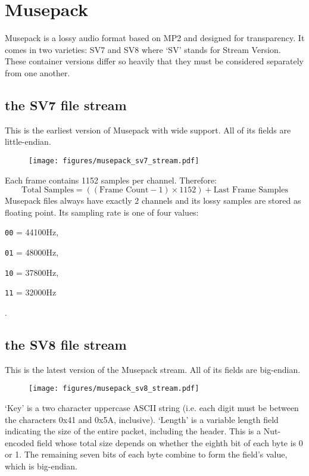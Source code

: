\chapter{Musepack}
Musepack is a lossy audio format based on MP2 and designed for
transparency.
It comes in two varieties: SV7 and SV8 where `SV' stands for
Stream Version.
These container versions differ so heavily that they must be
considered separately from one another.
\section{the SV7 file stream}
This is the earliest version of Musepack with wide support.
All of its fields are little-endian.
\begin{figure}[h]
\texttt{[image: figures/musepack\_sv7\_stream.pdf]}
\end{figure}
Each frame contains 1152 samples per channel.
Therefore:
\begin{equation}
\text{Total Samples} = ((\text{Frame Count} - 1) \times 1152) + \text{Last Frame Samples}
\end{equation}
Musepack files always have exactly 2 channels and its lossy samples
are stored as floating point.
Its sampling rate is one of four values:

\begin{inparaenum}
\item[\texttt{00} = ] 44100Hz,
\item[\texttt{01} = ] 48000Hz,
\item[\texttt{10} = ] 37800Hz,
\item[\texttt{11} = ] 32000Hz
\end{inparaenum}
.

\pagebreak

\section{the SV8 file stream}
This is the latest version of the Musepack stream.
All of its fields are big-endian.
\begin{figure}[h]
\texttt{[image: figures/musepack\_sv8\_stream.pdf]}
\end{figure}
\par
\noindent
`Key' is a two character uppercase ASCII string
(i.e. each digit must be between the characters 0x41 and 0x5A, inclusive).
`Length' is a variable length field indicating the size of the entire packet,
including the header.
This is a Nut-encoded field whose total size depends on whether
the eighth bit of each byte is 0 or 1.
The remaining seven bits of each byte combine to form the field's value,
which is big-endian.

